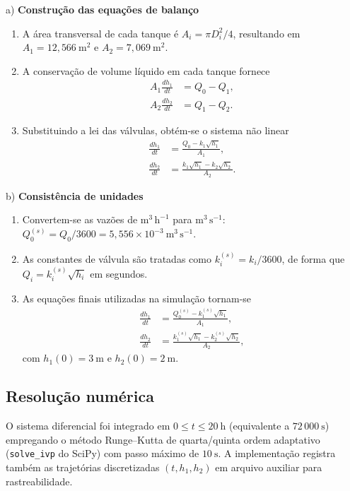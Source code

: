 \documentclass{article}
\begin{document}
a) \textbf{Construção das equações de balanço}
\begin{enumerate}
  \item A área transversal de cada tanque é $A_i = \pi D_i^2 / 4$, resultando em $A_1 = 12{,}566\ \mathrm{m^2}$ e $A_2 = 7{,}069\ \mathrm{m^2}$.
  \item A conservação de volume líquido em cada tanque fornece
  \begin{align}
    A_1 \frac{dh_1}{dt} &= Q_0 - Q_1, \\
    A_2 \frac{dh_2}{dt} &= Q_1 - Q_2.
  \end{align}
  \item Substituindo a lei das válvulas, obtém-se o sistema não linear
  \begin{align}
    \frac{dh_1}{dt} &= \frac{Q_0 - k_1\sqrt{h_1}}{A_1}, \\
    \frac{dh_2}{dt} &= \frac{k_1\sqrt{h_1} - k_2\sqrt{h_2}}{A_2}.
  \end{align}
\end{enumerate}

b) \textbf{Consistência de unidades}
\begin{enumerate}
  \item Convertem-se as vazões de $\mathrm{m^3\,h^{-1}}$ para $\mathrm{m^3\,s^{-1}}$: $Q_0^{(s)} = Q_0/3600 = 5{,}556 \times 10^{-3}\ \mathrm{m^3\,s^{-1}}$.
  \item As constantes de válvula são tratadas como $k_i^{(s)} = k_i/3600$, de forma que $Q_i = k_i^{(s)}\sqrt{h_i}$ em segundos.
  \item As equações finais utilizadas na simulação tornam-se
  \begin{align}
    \frac{dh_1}{dt} &= \frac{Q_0^{(s)} - k_1^{(s)}\sqrt{h_1}}{A_1}, \\
    \frac{dh_2}{dt} &= \frac{k_1^{(s)}\sqrt{h_1} - k_2^{(s)}\sqrt{h_2}}{A_2},
  \end{align}
  com $h_1(0)=3\ \mathrm{m}$ e $h_2(0)=2\ \mathrm{m}$.
\end{enumerate}

\subsection*{Resolução numérica}
O sistema diferencial foi integrado em $0 \leq t \leq 20\ \mathrm{h}$ (equivalente a $72\,000\ \mathrm{s}$) empregando o método Runge--Kutta de quarta/quinta ordem adaptativo (\texttt{solve\_ivp} do SciPy) com passo máximo de $10\ \mathrm{s}$. A implementação registra também as trajetórias discretizadas $(t, h_1, h_2)$ em arquivo auxiliar para rastreabilidade.
\end{document}
